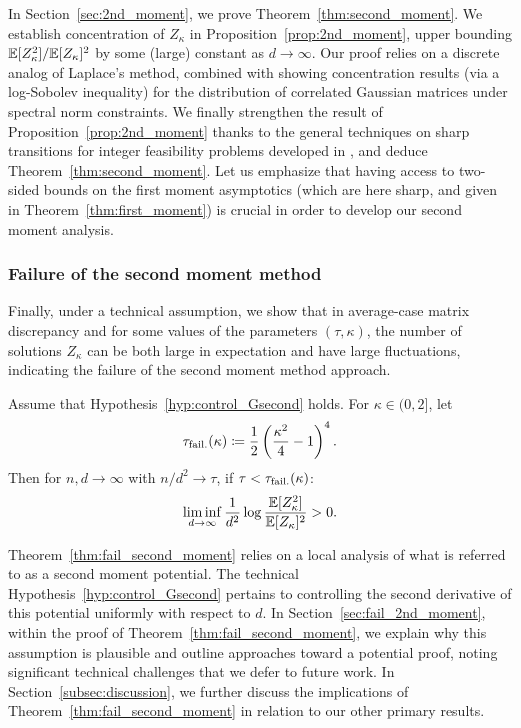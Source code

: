 \noindent
In Section~\ref{sec:2nd_moment}, we prove Theorem~\ref{thm:second_moment}. 
We establish concentration of $Z_\kappa$ in Proposition~\ref{prop:2nd_moment}, 
upper bounding $\mathbb{E}[Z_\kappa^2] / \mathbb{E}[Z_\kappa]^2$ by some (large) constant as $d \to \infty$. 
Our proof relies on a discrete analog of Laplace's method, combined with showing concentration results (via a log-Sobolev inequality) for the distribution of correlated Gaussian matrices under spectral norm constraints.
We finally strengthen the result of Proposition~\ref{prop:2nd_moment} thanks to the general techniques on sharp transitions for integer feasibility problems 
developed in \cite{altschuler2023zero}, and deduce Theorem~\ref{thm:second_moment}.
Let us emphasize that having access to two-sided bounds on the first moment asymptotics (which are here sharp, and given in Theorem~\ref{thm:first_moment}) 
is crucial in order to develop our second moment analysis.

\subsubsection{Failure of the second moment method}

\noindent
Finally, under a technical assumption, we show that in average-case matrix discrepancy and
for some values of the parameters $(\tau, \kappa)$,
the number of solutions $Z_\kappa$ can be both large in expectation and have large fluctuations, indicating the failure of the 
second moment method approach.
\begin{theorem}
    \label{thm:fail_second_moment}
    Assume that Hypothesis~\ref{hyp:control_Gsecond} holds.
    For $\kappa \in (0,2]$, let 
    \begin{equation}\label{eq:tau_f}
        \tau_{{\rm fail.}}(\kappa) \coloneqq \frac{1}{2} \left(\frac{\kappa^2}{4} - 1\right)^4.
    \end{equation}
    Then for $n, d \to \infty$ with $n/d^2 \to \tau$, if $\tau < \tau_{\rm fail.}(\kappa)$:
    \begin{equation}\label{eq:fail_second_moment}
        \liminf_{d \to \infty} \frac{1}{d^2} \log \frac{\mathbb{E}[Z_\kappa^2]}{\mathbb{E}[Z_\kappa]^2} > 0.
    \end{equation}
\end{theorem}
\noindent
Theorem~\ref{thm:fail_second_moment} relies on a local analysis of what is referred to as a second moment potential.
The technical Hypothesis~\ref{hyp:control_Gsecond} pertains to controlling the second derivative of this potential uniformly with respect to $d$.
In Section~\ref{sec:fail_2nd_moment}, within the proof of Theorem~\ref{thm:fail_second_moment},
we explain why this assumption is plausible and outline approaches toward a potential proof, noting significant technical challenges that we defer to future work.
In Section~\ref{subsec:discussion}, we further discuss the implications of Theorem~\ref{thm:fail_second_moment} in relation to our other primary results.



